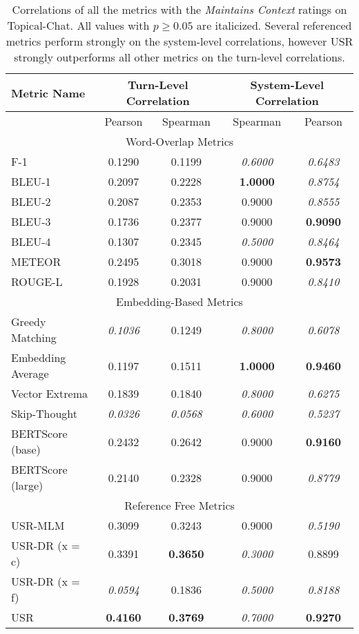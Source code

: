 \documentclass[11pt,a4paper]{article}
\begin{document}
\begin{table*}
    \centering
    \renewcommand*{\arraystretch}{1.2}
    \begin{tabular}{|l|c|c|c|c|}
    \hline
        \textbf{Metric Name} & \multicolumn{2}{|c|}{\textbf{Turn-Level Correlation}} & \multicolumn{2}{|c|}{\textbf{System-Level Correlation}}  \\ \hline
         & Pearson & Spearman & Spearman & Pearson \\ \hline
         \multicolumn{5}{|c|}{Word-Overlap Metrics} \\ \hline
F-1 & 0.1290 & 0.1199 & \textit{0.6000} & \textit{0.6483} \\
BLEU-1 & 0.2097 & 0.2228 & \textbf{1.0000} & \textit{0.8754} \\
BLEU-2 & 0.2087 & 0.2353 & 0.9000 & \textit{0.8555} \\
BLEU-3 & 0.1736 & 0.2377 & 0.9000 & \textbf{0.9090} \\
BLEU-4 & 0.1307 & 0.2345 & \textit{0.5000} & \textit{0.8464} \\
METEOR & 0.2495 & 0.3018 & 0.9000 & \textbf{0.9573} \\
ROUGE-L & 0.1928 & 0.2031 & 0.9000 & \textit{0.8410} \\   \hline
\multicolumn{5}{|c|}{Embedding-Based Metrics} \\ \hline
Greedy Matching & \textit{0.1036} & 0.1249 & \textit{0.8000} & \textit{0.6078} \\
Embedding Average & 0.1197 & 0.1511 & \textbf{1.0000} & \textbf{0.9460} \\
Vector Extrema & 0.1839 & 0.1840 & \textit{0.8000} & \textit{0.6275} \\
Skip-Thought & \textit{0.0326} & \textit{0.0568} & \textit{0.6000} & \textit{0.5237} \\
BERTScore (base) & 0.2432 & 0.2642 & 0.9000 & \textbf{0.9160} \\
BERTScore (large) & 0.2140 & 0.2328 & 0.9000 & \textit{0.8779} \\ \hline
\multicolumn{5}{|c|}{Reference Free Metrics} \\ \hline
USR-MLM & 0.3099 & 0.3243 & 0.9000 & \textit{0.5190} \\
USR-DR (x = c) & 0.3391 & \textbf{0.3650} & \textit{0.3000} & 0.8899 \\
USR-DR (x = f) & \textit{0.0594} & 0.1836 & \textit{0.5000} & \textit{0.8188} \\
USR & \textbf{0.4160} & \textbf{0.3769} & \textit{0.7000} & \textbf{0.9270} \\ \hline
    \end{tabular}
    \caption{Correlations of all the metrics with the \textit{Maintains Context} ratings on Topical-Chat. All values with $p \geq 0.05$ are italicized. Several referenced metrics perform strongly on the system-level correlations, however USR strongly outperforms all other metrics on the turn-level correlations.}
    
\end{table*}
\end{document}
